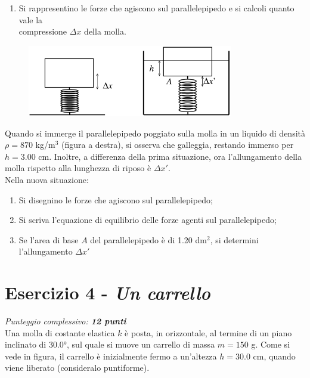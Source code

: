 \documentclass{article}
\begin{document}
\begin{enumerate}[label=\textbf{\alph*)}]
    \item Si rappresentino le forze che agiscono sul parallelepipedo e si 
        calcoli quanto vale la \\ compressione $\Delta{x}$ della molla. 
\end{enumerate}

\begin{figure}[h]
    \centering
    \includegraphics[width=0.8\textwidth]{Esercizio 3.png}
    \vspace{0.4cm}
\end{figure}

Quando si immerge il parallelepipedo poggiato sulla molla in un liquido di
densità $\rho = 870$ kg/m$^3$ (figura a destra), si osserva che galleggia,
restando immerso per $h = 3.00$ cm. Inoltre, a differenza della prima
situazione, ora l'allungamento della molla rispetto alla lunghezza di
riposo è $\Delta{x'}$. \\ Nella nuova situazione:

\begin{enumerate}[label=\textbf{\alph*)}, start=2]
    \item Si disegnino le forze che agiscono sul parallelepipedo;
    \item Si scriva l'equazione di equilibrio delle forze agenti sul parallelepipedo;
    \item Se l'area di base $A$ del parallelepipedo è di 1.20 dm$^2$, si
        determini l'allungamento $\Delta{x'}$
\end{enumerate}
\pagebreak

\section*{Esercizio 4 - \textit{Un carrello}}
\vspace{-3mm} {\textit{Punteggio complessivo: \textbf{12 punti}}} \vspace{5mm} \\
Una molla di costante elastica $k$ è posta, in orizzontale, al termine di un
piano inclinato di 30.0°, sul quale si muove un carrello di massa
$m = 150$ g. Come si vede in figura, il carrello è inizialmente fermo a
un'altezza $h = 30.0$ cm, quando viene liberato (consideralo puntiforme).
\end{document}
